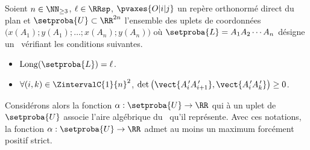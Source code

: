 \begin{fact} \label{at-least-one-ncycle}
    Soient $n \in \NN_{\geq3}$,
    $\ell \in \RRsp$,
    $\pvaxes{O | i | j}$ un repère orthonormé direct du plan
    et
    $\setproba{U} \subset \RR^{2n}$ l'ensemble des uplets de coordonnées $\big( x(A_1) ; y(A_1) ; \dots ; x(A_n) ; y(A_n) \big)$ où $\setproba{L} = A_1 A_2 \cdots A_n$ désigne un \ncycle\ vérifiant les conditions suivantes.
    \begin{itemize}
        \item $\cyclelen{\setproba{L}} = \ell$.
    
        \item $\forall (i, k) \in \ZintervalC{1}{n}^2$,
		$\det \big( \vect{A^{\,\prime}_i A^{\,\prime}_{i+1}}, \vect{A^{\,\prime}_i A^{\,\prime}_k} \big) \geq 0$.
    \end{itemize}
    
    Considérons alors la fonction $\alpha: \setproba{U} \rightarrow \RR$ qui à un uplet de $\setproba{U}$ associe l'aire algébrique du \ncycle\ qu'il représente.
	Avec ces notations, la fonction $\alpha: \setproba{U} \rightarrow \RR$ admet au moins un maximum forcément positif strict.
\end{fact}


